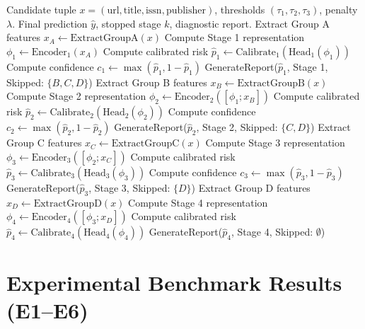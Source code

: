 \documentclass[journal]{IEEEtran}
\begin{document}
\begin{algorithm}[!t]
\caption{Adaptive Cost-Aware Progressive Inference}
\label{alg:progressive}
\begin{algorithmic}[1]
\REQUIRE Candidate tuple $x = (\text{url}, \text{title}, \text{issn}, \text{publisher})$, thresholds $(\tau_1, \tau_2, \tau_3)$, penalty $\lambda$.
\ENSURE Final prediction $\hat{y}$, stopped stage $k$, diagnostic report.
\STATE Extract Group A features $x_A \leftarrow \text{ExtractGroupA}(x)$
\STATE Compute Stage 1 representation $\phi_1 \leftarrow \text{Encoder}_1(x_A)$
\STATE Compute calibrated risk $\hat{p}_1 \leftarrow \text{Calibrate}_1(\text{Head}_1(\phi_1))$
\STATE Compute confidence $c_1 \leftarrow \max(\hat{p}_1, 1 - \hat{p}_1)$
    \RETURN GenerateReport($\hat{p}_1$, Stage 1, Skipped: $\{B, C, D\}$)
\ENDIF
\STATE Extract Group B features $x_B \leftarrow \text{ExtractGroupB}(x)$
\STATE Compute Stage 2 representation $\phi_2 \leftarrow \text{Encoder}_2([\phi_1; x_B])$
\STATE Compute calibrated risk $\hat{p}_2 \leftarrow \text{Calibrate}_2(\text{Head}_2(\phi_2))$
\STATE Compute confidence $c_2 \leftarrow \max(\hat{p}_2, 1 - \hat{p}_2)$
    \RETURN GenerateReport($\hat{p}_2$, Stage 2, Skipped: $\{C, D\}$)
\ENDIF
\STATE Extract Group C features $x_C \leftarrow \text{ExtractGroupC}(x)$
\STATE Compute Stage 3 representation $\phi_3 \leftarrow \text{Encoder}_3([\phi_2; x_C])$
\STATE Compute calibrated risk $\hat{p}_3 \leftarrow \text{Calibrate}_3(\text{Head}_3(\phi_3))$
\STATE Compute confidence $c_3 \leftarrow \max(\hat{p}_3, 1 - \hat{p}_3)$
    \RETURN GenerateReport($\hat{p}_3$, Stage 3, Skipped: $\{D\}$)
\ENDIF
\STATE Extract Group D features $x_D \leftarrow \text{ExtractGroupD}(x)$
\STATE Compute Stage 4 representation $\phi_4 \leftarrow \text{Encoder}_4([\phi_3; x_D])$
\STATE Compute calibrated risk $\hat{p}_4 \leftarrow \text{Calibrate}_4(\text{Head}_4(\phi_4))$
\RETURN GenerateReport($\hat{p}_4$, Stage 4, Skipped: $\emptyset$)
\end{algorithmic}
\end{algorithm}

\section{Experimental Benchmark Results (E1--E6)}
\end{document}
